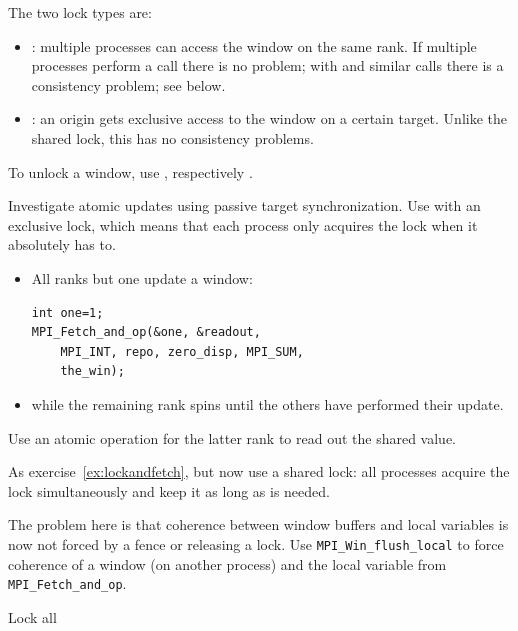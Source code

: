 The two lock types are:
\begin{itemize}
\item {}: multiple processes can access 
  the window on the same rank.
  If multiple processes perform a  call there
  is no problem; with  and similar calls
  there is a consistency problem; see below.
\item {}: an origin gets exclusive access to the
  window on a certain target.
  Unlike the shared lock, this has no consistency problems.
\end{itemize}

To unlock a window, use
, %
respectively .

\begin{exercise}
  \label{ex:lockandfetch}
  Investigate atomic updates using passive target synchronization.
  Use  with an exclusive lock, which
  means that each process only acquires the lock when it absolutely has to.
  \begin{itemize}
  \item All ranks but one update a window:
\begin{lstlisting}
int one=1;
MPI_Fetch_and_op(&one, &readout,
    MPI_INT, repo, zero_disp, MPI_SUM,
    the_win);
\end{lstlisting}
  \item while the remaining rank spins until the others have performed their update.
  \end{itemize}
  Use an atomic operation for the latter rank to read out the shared value.
\end{exercise}

\begin{exercise}
  \label{ex:lockfetchshared}
  As exercise~\ref{ex:lockandfetch}, but now use a shared lock:
  all processes acquire the lock simultaneously and keep it as long as is needed.

  The problem here is that coherence between window buffers and local variables is
  now not forced by a fence or releasing a lock. Use \lstinline{MPI_Win_flush_local} to
  force coherence of a window (on another process) and the local variable from
  \lstinline{MPI_Fetch_and_op}.
\end{exercise}

 {Lock all}
\label{sec:win-lock-all}

